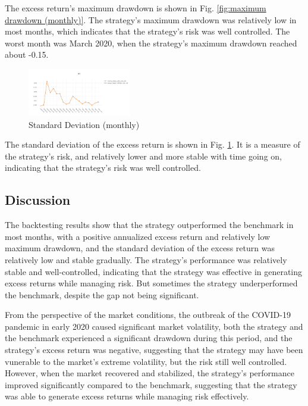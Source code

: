 \documentclass[conference]{IEEEtran}
\begin{document}
{The excess return's maximum drawdown is shown in Fig. \ref{fig:maximum drawdown (monthly)}.
The strategy's maximum drawdown was relatively low in most months, which indicates that the strategy's risk was well controlled.
The worst month was March 2020, when the strategy's maximum drawdown reached about -0.15.

\begin{figure}[htbp]
\centering
    \includegraphics[width=0.4\textwidth]{std.png}
    \caption{Standard Deviation (monthly)}
    \label{fig:standard deviation (monthly)}
\end{figure}

The standard deviation of the excess return is shown in Fig. \ref{fig:standard deviation (monthly)}.
It is a measure of the strategy's risk, and relatively lower and more stable with time going on, indicating that the strategy's risk was well controlled.

\subsection{\textbf{Discussion}}

The backtesting results show that the strategy outperformed the benchmark in most months, with a positive annualized excess return and relatively low maximum drawdown, and the standard deviation of the excess return was relatively low and stable gradually.
The strategy's performance was relatively stable and well-controlled, indicating that the strategy was effective in generating excess returns while managing risk.
But sometimes the strategy underperformed the benchmark, despite the gap not being significant.

From the perspective of the market conditions, the outbreak of the COVID-19 pandemic in early 2020 caused significant market volatility, both the strategy and the benchmark experienced a significant drawdown during this period, and the strategy's excess return was negative, suggesting that the strategy may have been vunerable to the market's extreme volatility, but the risk still well controlled.
However, when the market recovered and stabilized, the strategy's performance improved significantly compared to the benchmark, suggesting that the strategy was able to generate excess returns while managing risk effectively.

}
\end{document}
